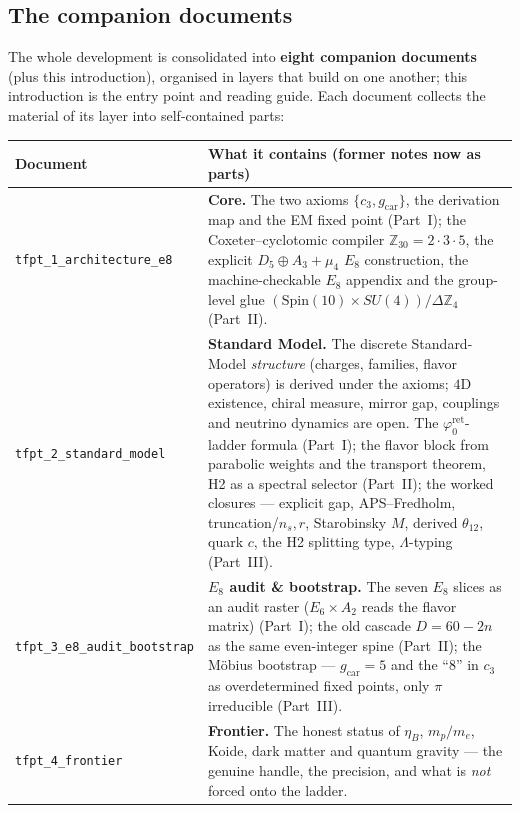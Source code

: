 \documentclass[11pt,a4paper]{article}
\newcommand{\cthree}{c_3}
\newcommand{\gcar}{g_{\mathrm{car}}}
\newcommand{\phiz}{\varphi_0^{\mathrm{ret}}}
\newcommand{\Z}{\mathbb{Z}}
\begin{document}
\TFPTanchorcockpit

\subsection*{The companion documents}

\noindent The whole development is consolidated into \textbf{eight companion documents} (plus
this introduction), organised in layers that build on one another; this introduction is the entry point
and reading guide. Each document collects the material of its layer into self-contained parts:

\begin{center}\scriptsize
\renewcommand{\arraystretch}{1.25}
\begin{tabularx}{\linewidth}{@{}p{3.6cm}Y@{}}
\toprule
\textbf{Document} & \textbf{What it contains (former notes now as parts)} \\
\midrule
\texttt{tfpt\_1\_architecture\_e8} & \textbf{Core.} The two axioms $\{\cthree,\gcar\}$, the derivation map and the EM fixed point (Part~I); the Coxeter--cyclotomic compiler $\Z_{30}{=}2{\cdot}3{\cdot}5$, the explicit $D_5{\oplus}A_3{+}\mu_4$ $E_8$ construction, the machine-checkable $E_8$ appendix and the group-level glue $(\mathrm{Spin}(10){\times}SU(4))/\Delta\Z_4$ (Part~II). \\
\texttt{tfpt\_2\_standard\_model} & \textbf{Standard Model.} The discrete Standard-Model \emph{structure} (charges, families, flavor operators) is derived under the axioms; $4$D existence, chiral measure, mirror gap, couplings and neutrino dynamics are open.  The $\phiz$-ladder formula (Part~I); the flavor block from parabolic weights and the transport theorem, H2 as a spectral selector (Part~II); the worked closures --- explicit gap, APS--Fredholm, truncation/$n_s,r$, Starobinsky $M$, derived $\theta_{12}$, quark $c$, the H2 splitting type, $\Lambda$-typing (Part~III). \\
\texttt{tfpt\_3\_e8\_audit\_bootstrap} & \textbf{$E_8$ audit \& bootstrap.} The seven $E_8$ slices as an audit raster ($E_6{\times}A_2$ reads the flavor matrix) (Part~I); the old cascade $D{=}60{-}2n$ as the same even-integer spine (Part~II); the M\"obius bootstrap --- $\gcar{=}5$ and the ``$8$'' in $\cthree$ as overdetermined fixed points, only $\pi$ irreducible (Part~III). \\
\texttt{tfpt\_4\_frontier} & \textbf{Frontier.} The honest status of $\eta_B$, $m_p/m_e$, Koide, dark matter and quantum gravity --- the genuine handle, the precision, and what is \emph{not} forced onto the ladder. \\

\end{tabularx}
\end{center}
\end{document}
